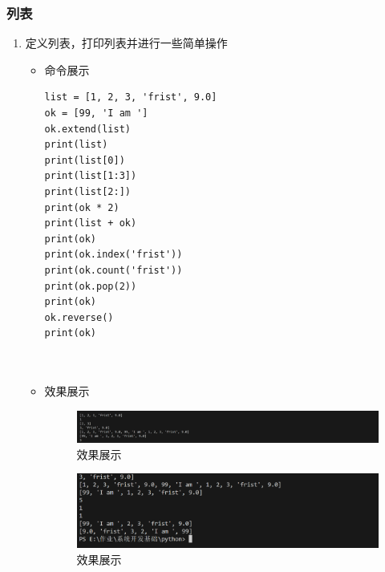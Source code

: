 \documentclass[UTF8]{ctexart}
\begin{document}
\subsubsection{列表}

\begin{enumerate}
  \item 定义列表，打印列表并进行一些简单操作
  \begin{itemize}
  \item 命令展示
  \begin{verbatim}
list = [1, 2, 3, 'frist', 9.0]
ok = [99, 'I am ']
ok.extend(list)
print(list)
print(list[0])
print(list[1:3])
print(list[2:])
print(ok * 2)
print(list + ok)
print(ok)
print(ok.index('frist'))
print(ok.count('frist'))
print(ok.pop(2))
print(ok)
ok.reverse()
print(ok)

    
  \end{verbatim}

  \item 效果展示
  \begin{figure}[H]
    \centering
    \includegraphics[width=\textwidth]{21} %
    \caption{效果展示}
  
  \end{figure}
  \begin{figure}[H]
    \centering
    \includegraphics[width=\textwidth]{211} %
    \caption{效果展示}
  
  \end{figure}
\end{itemize}
\end{enumerate}
\end{document}
